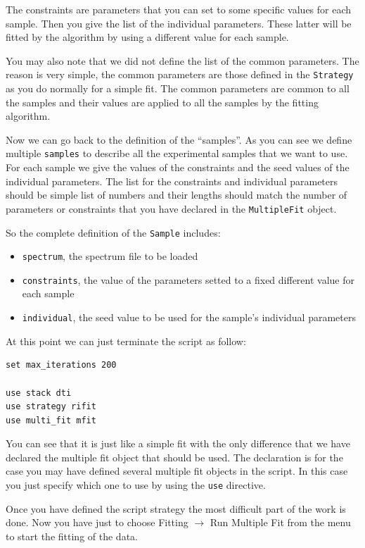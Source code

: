 \documentclass[a4paper]{report}
\begin{document}
The constraints are parameters that you can set to some specific values for each sample.
Then you give the list of the individual parameters.
These latter will be fitted by the algorithm by using a different value for each sample.

You may also note that we did not define the list of the common parameters.
The reason is very simple, the common parameters are those defined in the \texttt{Strategy} as you do normally for a simple fit.
The common parameters are common to all the samples and their values are applied to all the samples by the fitting algorithm.

Now we can go back to the definition of the ``samples''. As you can see we define multiple \texttt{samples} to describe all the experimental samples that we want to use.
For each sample we give the values of the constraints and the seed values of the individual parameters.
The list for the constraints and individual parameters should be simple list of numbers and their lengths should match the number of parameters or constraints that you have declared in the \texttt{MultipleFit} object.

So the complete definition of the \texttt{Sample} includes:
\begin{itemize}
  \item \texttt{spectrum}, the spectrum file to be loaded
  \item \texttt{constraints}, the value of the parameters setted to a fixed different value for each sample
  \item \texttt{individual}, the seed value to be used for the sample's individual parameters
\end{itemize}

At this point we can just terminate the script as follow:
\begin{verbatim}
set max_iterations 200

use stack dti
use strategy rifit
use multi_fit mfit
\end{verbatim}

You can see that it is just like a simple fit with the only difference that we have declared the multiple fit object that should be used.
The declaration is for the case you may have defined several multiple fit objects in the script.
In this case you just specify which one to use by using the \texttt{use} directive.

Once you have defined the script strategy the most difficult part of the work is done.
Now you have just to choose \textsf{Fitting $\rightarrow$ Run Multiple Fit} from the menu to start the fitting of the data.
\end{document}
